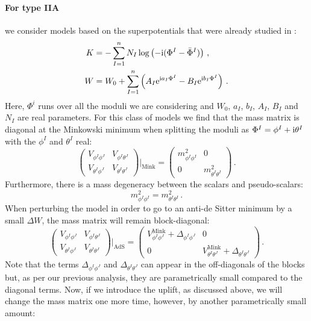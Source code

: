 \documentclass[a4paper,12pt,twoside,openright]{report}
\newcommand{\be}{\begin{equation}}
\newcommand{\ee}{\end{equation}}
\newcommand{\bea}{\begin{equation}\begin{aligned}}
\newcommand{\eea}{\end{aligned}\end{equation}}
\def\rmi{{\rm i}}
\def\rme{{\rm e}}
\begin{document}
\paragraph{For type IIA} we consider models based on the superpotentials that were already studied in \cite{Kallosh:2019zgd}:
\bea 
K &= - \sum_{I=1}^n N_I \log \left( -\rmi (\Phi^I - \bar{\Phi}^I )\right)\,,\\
W &= W_0 + \sum_{I=1}^n \left( A_I \rme^{\rmi a_I \Phi^I} - B_I \rme^{\rmi b_I \Phi^I} \right)\,.
\label{eq:IIAKW}
\eea 
Here, $\Phi^i$ runs over all the moduli we are considering and $W_0$, $a_I$, $b_I$, $A_I$, $B_I$ and $N_I$ are real parameters. For this class of models we find that the mass matrix is diagonal at the Minkowski minimum when splitting the moduli as $\Phi^I = \phi^I + \rmi \theta^I$ with the $\phi^I$ and $\theta^I$ real:
\be 
\begin{pmatrix}
V_{\phi^I\phi^J} & V_{\phi^I \theta^J}\\
V_{\theta^I\phi^J} & V_{\theta^I \theta^J}
\end{pmatrix}\Bigg|_{\text{Mink}}
=
\begin{pmatrix}
m^2_{\phi^I\phi^I} & 0\\
0 & m^2_{\theta^I \theta^I}
\end{pmatrix}\,.
\ee
Furthermore, there is a mass degeneracy between the scalars and pseudo-scalars:
\be 
m^2_{\phi^I\phi^I} = m^2_{\theta^I \theta^I}\,.
\ee
When perturbing the model in order to go to an anti-de Sitter minimum by a small $\Delta W$, the mass matrix will remain block-diagonal:
\be 
\begin{pmatrix}
V_{\phi^I\phi^J} & V_{\phi^I \theta^J}\\
V_{\theta^I\phi^J} & V_{\theta^I \theta^J}
\end{pmatrix}\Bigg|_{\text{AdS}}
=
\begin{pmatrix}
V^{\text{Mink}}_{\phi^I\phi^J} + \Delta_{\phi^I \phi^J}& 0\\
0 & V^{\text{Mink}}_{\theta^I \theta^J}+\Delta_{\theta^I \theta^J}
\end{pmatrix}\,.
\ee
Note that the terms $\Delta_{\phi^I \phi^J}$ and $\Delta_{\theta^I \theta^J}$ can appear in the off-diagonals of the blocks but, as per our previous analysis, they are parametrically small compared to the diagonal terms. Now, if we introduce the uplift, as discussed above, we will change the mass matrix one more time, however, by another parametrically small amount:
\end{document}
